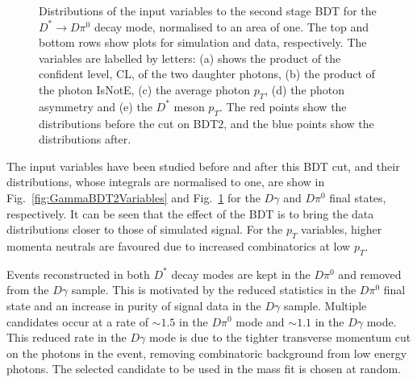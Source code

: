 \documentclass[oneside,12pt]{article}
\begin{document}
\begin{figure}[H]
\begin{tikzpicture}[scale=0.19]
\end{tikzpicture}
\caption{{Distributions of the input variables to the second stage BDT for
the $D^* \rightarrow D\pi^0$ decay mode, normalised to an area of one. The top
and bottom rows show plots for simulation and data, respectively. The variables
are labelled by letters: (a) shows the product of the confident level, CL, of
the two daughter photons, (b) the product of the photon IsNotE, (c) the average
photon $p_T$, (d) the photon asymmetry and (e) the $D^*$ meson $p_T$. The red
points show the distributions before the cut on BDT2, and the blue points show
the distributions after.}} \label{fig:Pi0BDT2Variables}
\end{figure}

The input variables have been studied before and after this BDT cut, and their
distributions, whose integrals are normalised to one, are show in
Fig.~\ref{fig:GammaBDT2Variables} and Fig.~\ref{fig:Pi0BDT2Variables} for the
$D\gamma$ and $D\pi^0$ final states, respectively. It can be seen that the
effect of the BDT is to bring the data distributions closer to those of
simulated signal. For the $p_T$ variables, higher momenta neutrals are favoured due
to increased combinatorics at low $p_T$.

Events reconstructed in both $D^{*}$ decay modes are kept in the $D\pi^0$
and removed from the $D\gamma$ sample. This is motivated by the reduced
statistics in the $D\pi^0$ final state and an increase in purity of signal data
in the $D\gamma$ sample. Multiple candidates occur at a rate of $\sim 1.5$ in
the $D\pi^0$ mode and $\sim 1.1$ in the $D\gamma$ mode. This reduced rate in the
$D\gamma$ mode is due to the tighter transverse momentum cut on the photons in
the event, removing combinatoric background from low energy photons. The
selected candidate to be used in the mass fit is chosen at random.
\end{document}
